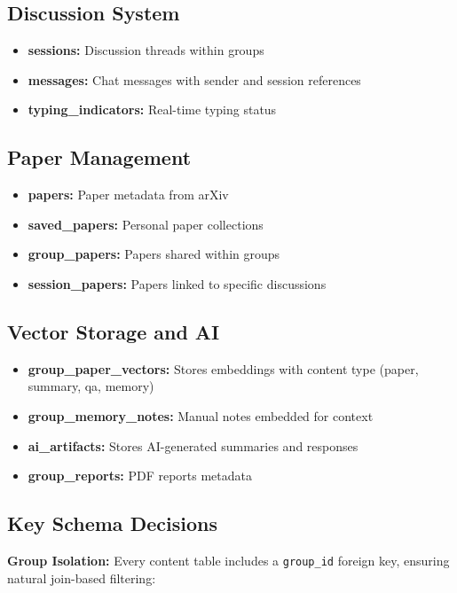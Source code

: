 \documentclass[12pt]{report}
\begin{document}
\subsection{Discussion System}
\begin{itemize}
    \item \textbf{sessions:} Discussion threads within groups
    \item \textbf{messages:} Chat messages with sender and session references
    \item \textbf{typing\_indicators:} Real-time typing status
\end{itemize}

\subsection{Paper Management}
\begin{itemize}
    \item \textbf{papers:} Paper metadata from arXiv
    \item \textbf{saved\_papers:} Personal paper collections
    \item \textbf{group\_papers:} Papers shared within groups
    \item \textbf{session\_papers:} Papers linked to specific discussions
\end{itemize}

\subsection{Vector Storage and AI}
\begin{itemize}
    \item \textbf{group\_paper\_vectors:} Stores embeddings with content type (paper, summary, qa, memory)
    \item \textbf{group\_memory\_notes:} Manual notes embedded for context
    \item \textbf{ai\_artifacts:} Stores AI-generated summaries and responses
    \item \textbf{group\_reports:} PDF reports metadata
\end{itemize}

\subsection{Key Schema Decisions}

\textbf{Group Isolation:} Every content table includes a \texttt{group\_id} foreign key, ensuring natural join-based filtering:
\end{document}
